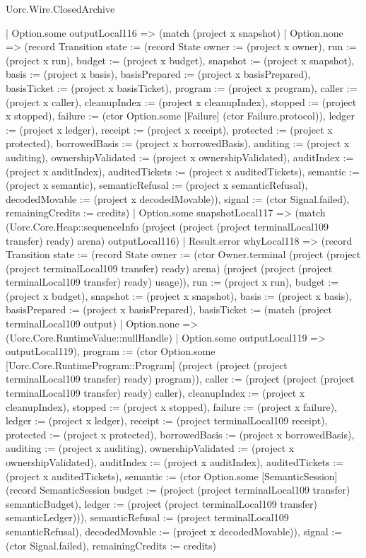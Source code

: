 \begin{lexlean}{Uorc.Wire.ClosedArchive}
\begin{semanticmodule}
{            | Option.some outputLocal116 => (match (project x snapshot)
              | Option.none => (record Transition {state := (record State {owner := (project x owner), run := (project x run), budget := (project x budget), snapshot := (project x snapshot), basis := (project x basis), basisPrepared := (project x basisPrepared), basisTicket := (project x basisTicket), program := (project x program), caller := (project x caller), cleanupIndex := (project x cleanupIndex), stopped := (project x stopped), failure := (ctor Option.some [Failure] (ctor Failure.protocol)), ledger := (project x ledger), receipt := (project x receipt), protected := (project x protected), borrowedBasis := (project x borrowedBasis), auditing := (project x auditing), ownershipValidated := (project x ownershipValidated), auditIndex := (project x auditIndex), auditedTickets := (project x auditedTickets), semantic := (project x semantic), semanticRefusal := (project x semanticRefusal), decodedMovable := (project x decodedMovable)}), signal := (ctor Signal.failed), remainingCredits := credits})
              | Option.some snapshotLocal117 => (match (Uorc.Core.Heap::sequenceInfo (project (project (project terminalLocal109 transfer) ready) arena) outputLocal116)
                | Result.error whyLocal118 => (record Transition {state := (record State {owner := (ctor Owner.terminal (project (project (project terminalLocal109 transfer) ready) arena) (project (project (project terminalLocal109 transfer) ready) usage)), run := (project x run), budget := (project x budget), snapshot := (project x snapshot), basis := (project x basis), basisPrepared := (project x basisPrepared), basisTicket := (match (project terminalLocal109 output)
                  | Option.none => (Uorc.Core.RuntimeValue::nullHandle)
                  | Option.some outputLocal119 => outputLocal119), program := (ctor Option.some [Uorc.Core.RuntimeProgram::Program] (project (project (project terminalLocal109 transfer) ready) program)), caller := (project (project (project terminalLocal109 transfer) ready) caller), cleanupIndex := (project x cleanupIndex), stopped := (project x stopped), failure := (project x failure), ledger := (project x ledger), receipt := (project terminalLocal109 receipt), protected := (project x protected), borrowedBasis := (project x borrowedBasis), auditing := (project x auditing), ownershipValidated := (project x ownershipValidated), auditIndex := (project x auditIndex), auditedTickets := (project x auditedTickets), semantic := (ctor Option.some [SemanticSession] (record SemanticSession {budget := (project (project terminalLocal109 transfer) semanticBudget), ledger := (project (project terminalLocal109 transfer) semanticLedger)})), semanticRefusal := (project terminalLocal109 semanticRefusal), decodedMovable := (project x decodedMovable)}), signal := (ctor Signal.failed), remainingCredits := credits})
}
\end{semanticmodule}
\end{lexlean}
